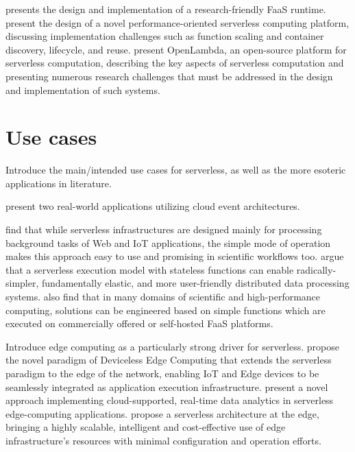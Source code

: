 \documentclass[utf8,english]{gradu3}
\begin{document}
\textcite{spillner17snafu} presents the design and implementation of a research-friendly FaaS runtime. \textcite{mcgrath17implement} present the design of a novel performance-oriented serverless computing platform, discussing implementation challenges such as function scaling and container discovery, lifecycle, and reuse. \textcite{hendrickson16openlambda} present OpenLambda, an open-source platform for serverless computation, describing the key aspects of serverless computation and presenting numerous research challenges that must be addressed in the design and implementation of such systems.

\section{Use cases}

Introduce the main/intended use cases for serverless, as well as the more esoteric applications in literature.

\textcite{mcgrath16cloudEventParadigms} present two real-world applications utilizing cloud event architectures.

\textcite{malawski17executescientific} find that while serverless infrastructures are designed mainly for processing background tasks of Web and IoT applications, the simple mode of operation makes this approach easy to use and promising in scientific workflows too. \textcite{jonas17occupy} argue that a serverless execution model with stateless functions can enable radically-simpler, fundamentally elastic, and more user-friendly distributed data processing systems. \textcite{spillner18faaster} also find that in many domains of scientific and high-performance computing, solutions can be engineered based on simple functions which are executed on commercially offered or self-hosted FaaS platforms.

Introduce edge computing as a particularly strong driver for serverless. \textcite{glikson17devicelessedge} propose the novel paradigm of Deviceless Edge Computing that extends the serverless paradigm to the edge of the network, enabling IoT and Edge devices to be seamlessly integrated as application execution infrastructure. \textcite{nastic17analyticsedge} present a novel approach implementing cloud-supported, real-time data analytics in serverless edge-computing applications. \textcite{baresi17edgecomputing} propose a serverless architecture at the edge, bringing a highly scalable, intelligent and cost-effective use of edge infrastructure’s resources with minimal configuration and operation efforts.
\end{document}
